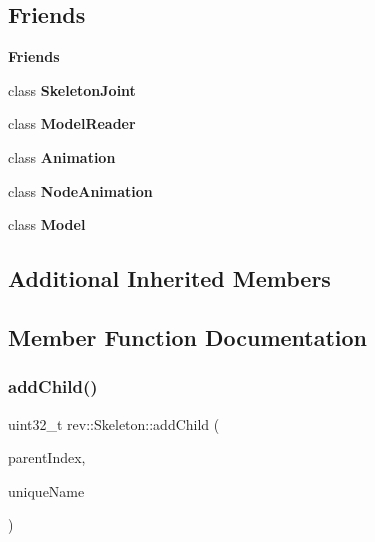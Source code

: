 \subsection*{Friends}
\begin{Indent}\textbf{ Friends}\par
\begin{DoxyCompactItemize}
\item 
\mbox{\label{classrev_1_1_skeleton_a54a2a68828f99f864406a3713e8ad9a5}} 
class {\bfseries Skeleton\+Joint}
\item 
\mbox{\label{classrev_1_1_skeleton_ac3e0a085a76d6fcad904e95ebbe2c6a5}} 
class {\bfseries Model\+Reader}
\item 
\mbox{\label{classrev_1_1_skeleton_af47625f50036c466946f960db7320bcf}} 
class {\bfseries Animation}
\item 
\mbox{\label{classrev_1_1_skeleton_a395c52c1b342efdb79f36b2d4b2f1565}} 
class {\bfseries Node\+Animation}
\item 
\mbox{\label{classrev_1_1_skeleton_a2bf2a0e9b454c55aa5dcb5aa4698697b}} 
class {\bfseries Model}
\end{DoxyCompactItemize}
\end{Indent}
\subsection*{Additional Inherited Members}


\subsection{Member Function Documentation}
\mbox{\label{classrev_1_1_skeleton_a34309a211bf14c61cdf910746de75c80}} 
\subsubsection{\texorpdfstring{addChild()}{addChild()}}
{\footnotesize\ttfamily uint32\+\_\+t rev\+::\+Skeleton\+::add\+Child (\begin{DoxyParamCaption}\item[{uint32\+\_\+t}]{parent\+Index,  }\item[{const \mbox{\hyperlink{classrev_1_1_g_string}{G\+String}} \&}]{unique\+Name }\end{DoxyParamCaption})}



